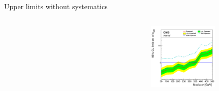 \documentclass[8pt]{beamer}
\begin{document}
\begin{frame}{Upper limits without systematics}
\begin{columns}
\begin{column}{0.33\textwidth}
\begin{center}
    		\end{center}		
		\end{column}
		\begin{column}{0.33\textwidth}
			\begin{center}
     			\includegraphics[width=1.0\textwidth, height=90pt]{figs/limit_pseudo2018.png}
    		\end{center}		
		\end{column}
\end{columns} \vfill
\end{frame}
\end{document}
